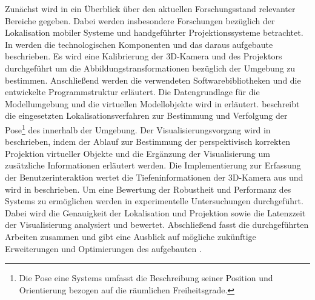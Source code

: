 Zunächst wird in  ein Überblick über den aktuellen Forschungsstand relevanter Bereiche gegeben. Dabei werden insbesondere Forschungen bezüglich der Lokalisation mobiler Systeme und handgeführter Projektionssysteme betrachtet. In  werden die technologischen Komponenten und das daraus aufgebaute \kps{} beschrieben. Es wird eine Kalibrierung der 3D-Kamera und des Projektors durchgeführt um die Abbildungstransformationen bezüglich der Umgebung zu bestimmen. Anschließend werden die verwendeten Softwarebibliotheken und die entwickelte Programmstruktur erläutert. Die Datengrundlage für die Modellumgebung und die virtuellen Modellobjekte wird in  erläutert.  beschreibt die eingesetzten Lokalisationsverfahren zur Bestimmung und Verfolgung der Pose\footnote{Die Pose eine Systems umfasst die Beschreibung seiner Position und Orientierung bezogen auf die räumlichen Freiheitsgrade.} des  innerhalb der Umgebung. Der Visualisierungsvorgang wird in  beschrieben, indem der Ablauf zur Bestimmung der perspektivisch korrekten Projektion virtueller Objekte und die Ergänzung der Visualisierung um zusätzliche Informationen erläutert werden. Die Implementierung zur Erfassung der Benutzerinteraktion wertet die Tiefeninformationen der 3D-Kamera aus und wird in  beschrieben. Um eine Bewertung der Robustheit und Performanz des Systems zu ermöglichen werden in  experimentelle Untersuchungen durchgeführt. Dabei wird die Genauigkeit der Lokalisation und Projektion sowie die Latenzzeit der Visualisierung analysiert und bewertet. Abschließend fasst  die durchgeführten Arbeiten zusammen und gibt eine Ausblick auf mögliche zukünftige Erweiterungen und Optimierungen des aufgebauten .

